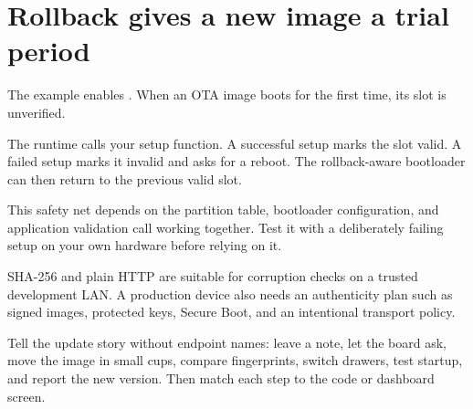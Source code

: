 \section{Rollback gives a new image a trial period}

The example enables . When an OTA image boots for the first time, its slot is unverified.

The runtime calls your setup function. A successful setup marks the slot valid. A failed setup marks it invalid and asks for a reboot. The rollback-aware bootloader can then return to the previous valid slot.

This safety net depends on the partition table, bootloader configuration, and application validation call working together. Test it with a deliberately failing setup on your own hardware before relying on it.

\begin{warningbox}
SHA-256 and plain HTTP are suitable for corruption checks on a trusted development LAN. A production device also needs an authenticity plan such as signed images, protected keys, Secure Boot, and an intentional transport policy.
\end{warningbox}

\begin{checkpoint}
Tell the update story without endpoint names: leave a note, let the board ask, move the image in small cups, compare fingerprints, switch drawers, test startup, and report the new version. Then match each step to the code or dashboard screen.
\end{checkpoint}

